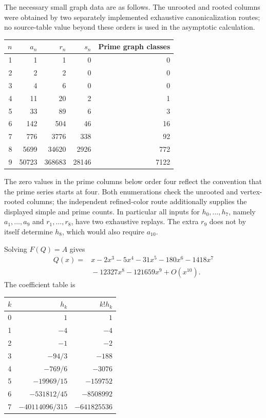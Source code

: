 \documentclass[11pt,letterpaper]{article}
\numberwithin{equation}{section}
\theoremstyle{definition}\newtheorem{definition}[theorem]{Definition}
\theoremstyle{remark}\newtheorem{remark}[theorem]{Remark}
\begin{document}
The necessary small graph data are as follows. The unrooted and rooted
columns were obtained by two separately implemented exhaustive
canonicalization routes; no source-table value beyond these orders
is used in the asymptotic calculation.
\begin{center}
\begin{tabular}{r r r r r}
\toprule
$n$ & $a_n$ & $r_n$ & $s_n$ & Prime graph classes\\
\midrule
1&1&1&0&0\\
2&2&2&0&0\\
3&4&6&0&0\\
4&11&20&2&1\\
5&33&89&6&3\\
6&142&504&46&16\\
7&776&3776&338&92\\
8&5699&34620&2926&772\\
9&50723&368683&28146&7122\\
\bottomrule
\end{tabular}
\end{center}
The zero values in the prime columns below order four reflect the
convention that the prime series starts at four. Both enumerations
check the unrooted and vertex-rooted columns; the independent
refined-color route additionally supplies the displayed simple and
prime counts. In particular all inputs for $h_0,\ldots,h_7$,
namely $a_1,\ldots,a_9$ and $r_1,\ldots,r_8$, have two exhaustive
replays. The extra $r_9$ does not by itself determine $h_8$, which
would also require $a_{10}$.

Solving $F(Q)=A$ gives
\begin{align*}
 Q(x)={}&x-2x^3-5x^4-31x^5-180x^6-1418x^7\\
       &{}-12327x^8-121659x^9+O(x^{10}).
\end{align*}
The coefficient table is
\begin{center}
\begin{tabular}{r r r}
\toprule
$k$ & $h_k$ & $k!h_k$\\
\midrule
0&$1$&$1$\\
1&$-4$&$-4$\\
2&$-1$&$-2$\\
3&$-94/3$&$-188$\\
4&$-769/6$&$-3076$\\
5&$-19969/15$&$-159752$\\
6&$-531812/45$&$-8508992$\\
7&$-40114096/315$&$-641825536$\\
\bottomrule
\end{tabular}
\end{center}
\end{document}
